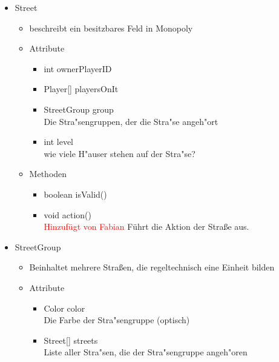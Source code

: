\documentclass[a4paper,10pt]{article}
\begin{document}
\begin{itemize}
\item Street
\begin{itemize}
\item beschreibt ein besitzbares Feld in Monopoly
\item Attribute
\begin{itemize}
\item int ownerPlayerID
\item Player[] playersOnIt
\item StreetGroup group
\\Die Stra"sengruppen, der die Stra"se angeh"ort
\item int level
\\wie viele H"auser stehen auf der Stra"se?
\end{itemize}
\item Methoden
\begin{itemize}
\item boolean isValid()
\item void action()
\\ \textcolor{red}{Hinzufügt von Fabian} Führt die Aktion der Straße aus.
\end{itemize}
\end{itemize}

\item StreetGroup
\begin{itemize}
\item Beinhaltet mehrere Straßen, die regeltechnisch eine Einheit bilden
\item Attribute
\begin{itemize}
\item Color color
\\Die Farbe der Stra"sengruppe (optisch)
\item Street[] streets
\\Liste aller Stra"sen, die der Stra"sengruppe angeh"oren
\end{itemize}
\end{itemize}


\end{itemize}
\end{document}
